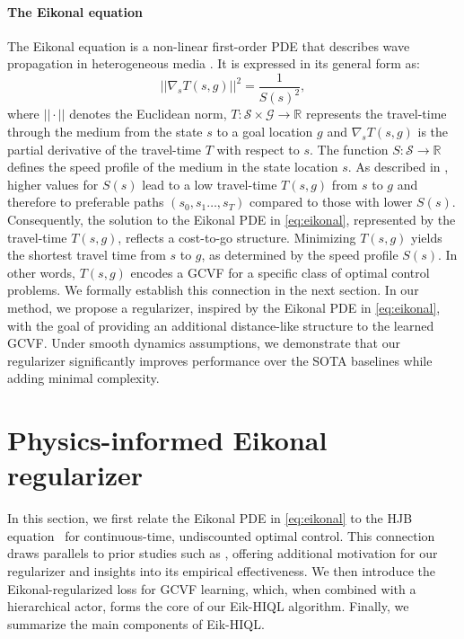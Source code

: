 \documentclass{article}
\theoremstyle{plain}
\theoremstyle{definition}
\theoremstyle{remark}
\begin{document}
\vspace{-0.0cm}
\paragraph{The Eikonal equation} 
The Eikonal equation is a non-linear first-order PDE that describes wave propagation in heterogeneous media \cite{noack2017acoustic}. It is expressed in its general form as:
\begin{equation}
    ||\nabla_s T(s,g)||^2 = \frac{1}{S(s)^2},
    \label{eq:eikonal}
\end{equation}
where $||\cdot||$ denotes the Euclidean norm, $T: \mathcal{S} \times \mathcal{G} \to \mathbb{R}$ represents the travel-time through the medium from the state $s$ to a goal location $g$ and $\nabla_s T(s,g)$ is the partial derivative of the travel-time $T$ with respect to $s$. The function $S: \mathcal{S} \to \mathbb{R}$ defines the speed profile of the medium in the state location $s$. As described in \cite{nintfields}, higher values for $S(s)$ lead to a low travel-time $T(s,g)$ from $s$ to $g$ and therefore to preferable paths $(s_0, s_1 \dots, s_T)$ compared to those with lower $S(s)$. Consequently, the solution to the Eikonal PDE in \eqref{eq:eikonal}, represented by the travel-time $T(s, g)$, reflects a cost-to-go structure. Minimizing $T(s, g)$ yields the shortest travel time from $s$ to $g$, as determined by the speed profile $S(s)$. In other words, $T(s,g)$ encodes a GCVF for a specific class of optimal control problems. We formally establish this connection in the next section. In our method, we propose a regularizer, inspired by the Eikonal PDE in \eqref{eq:eikonal}, with the goal of providing an additional distance-like structure to the learned GCVF. Under smooth dynamics assumptions, we demonstrate that our regularizer significantly improves performance over the SOTA baselines while adding minimal complexity.    

\vspace{-0.0cm}
\section{Physics-informed Eikonal regularizer}
\vspace{-0.0cm}
In this section, we first relate the Eikonal PDE in \eqref{eq:eikonal} to the HJB equation~\cite{munos1997convergent, munos1997reinforcement} for continuous-time, undiscounted optimal control. This connection draws parallels to prior studies such as \citet{lienenhancing}, offering additional motivation for our regularizer and insights into its empirical effectiveness. We then introduce the Eikonal-regularized loss for GCVF learning, which, when combined with a hierarchical actor, forms the core of our Eik-HIQL algorithm. Finally, we summarize the main components of Eik-HIQL.
\end{document}
